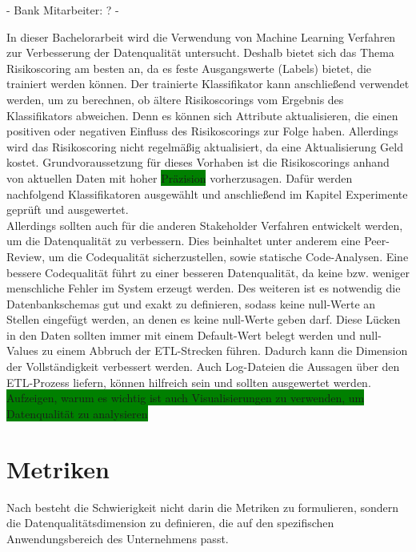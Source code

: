 - Bank Mitarbeiter: ?
- 

In dieser Bachelorarbeit wird die Verwendung von Machine Learning Verfahren zur Verbesserung der Datenqualität untersucht.
Deshalb bietet sich das Thema Risikoscoring am besten an, da es feste Ausgangswerte (Labels) bietet, die trainiert werden können.
Der trainierte Klassifikator kann anschließend verwendet werden, um zu berechnen, ob ältere Risikoscorings vom Ergebnis des Klassifikators abweichen.
Denn es können sich Attribute aktualisieren, die einen positiven oder negativen Einfluss des Risikoscorings zur Folge haben. 
Allerdings wird das Risikoscoring nicht regelmäßig aktualisiert, da eine Aktualisierung Geld kostet.
Grundvoraussetzung für dieses Vorhaben ist die Risikoscorings anhand von aktuellen Daten mit hoher \colorbox{green}{Präzision} vorherzusagen. 
Dafür werden nachfolgend Klassifikatoren ausgewählt und anschließend im Kapitel Experimente geprüft und ausgewertet.\\
Allerdings sollten auch für die anderen Stakeholder Verfahren entwickelt werden, um die Datenqualität zu verbessern.
Dies beinhaltet unter anderem eine Peer-Review, um die Codequalität sicherzustellen, sowie statische Code-Analysen.
Eine bessere Codequalität führt zu einer besseren Datenqualität, da keine bzw. weniger menschliche Fehler im System erzeugt werden.
Des weiteren ist es notwendig die Datenbankschemas gut und exakt zu definieren, sodass keine null-Werte an Stellen eingefügt werden, an denen es keine null-Werte geben darf.
Diese Lücken in den Daten sollten immer mit einem Default-Wert belegt werden und null-Values zu einem Abbruch der ETL-Strecken führen.
Dadurch kann die Dimension der Vollständigkeit verbessert werden.
Auch Log-Dateien die Aussagen über den ETL-Prozess liefern, können hilfreich sein und sollten ausgewertet werden.
\colorbox{green}{Aufzeigen, warum es wichtig ist auch Visualisierungen zu verwenden, um Datenqualität zu analysieren}


\section{Metriken}
Nach \cite{pipino2002} besteht die Schwierigkeit nicht darin die Metriken zu formulieren, sondern die Datenqualitätsdimension zu definieren, die auf den spezifischen Anwendungsbereich des Unternehmens passt. 



